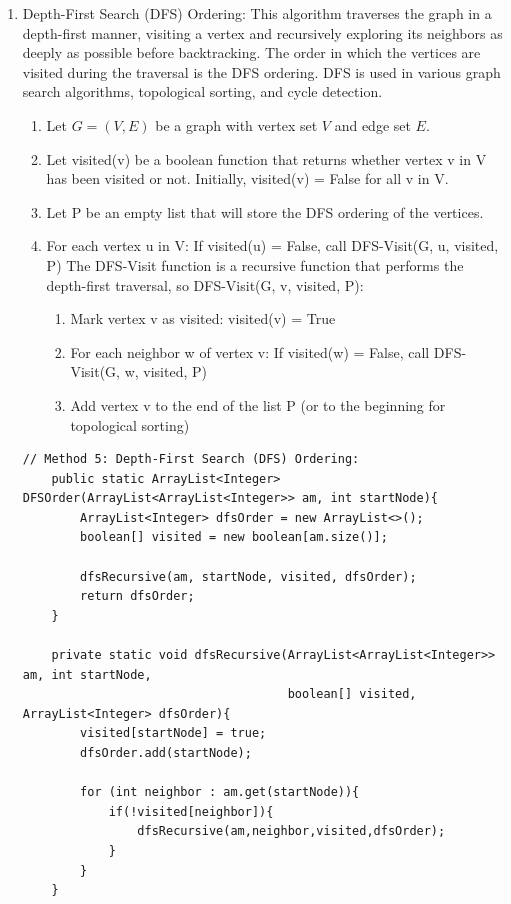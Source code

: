 \documentclass{article}
\begin{document}
\begin{enumerate}
\item Depth-First Search (DFS) Ordering: This algorithm traverses the graph in a depth-first manner, visiting a vertex and recursively exploring its neighbors as deeply as possible before backtracking. The order in which the vertices are visited during the traversal is the DFS ordering. DFS is used in various graph search algorithms, topological sorting, and cycle detection.\cite{DFS}
\begin{enumerate}
\item Let $G = (V, E)$ be a graph with vertex set $V$ and edge set $E$.
\item Let visited(v) be a boolean function that returns whether vertex v in V has been visited or not. Initially, visited(v) = False for all v in V.
\item Let P be an empty list that will store the DFS ordering of the vertices.
\item For each vertex u in V: If visited(u) = False, call DFS-Visit(G, u, visited, P)
The DFS-Visit function is a recursive function that performs the depth-first traversal, so DFS-Visit(G, v, visited, P):
\begin{enumerate}
    \item Mark vertex v as visited: visited(v) = True
    \item For each neighbor w of vertex v: If visited(w) = False, call DFS-Visit(G, w, visited, P)
    \item Add vertex v to the end of the list P (or to the beginning for topological sorting)
\end{enumerate}
\end{enumerate}


    \begin{verbatim}
// Method 5: Depth-First Search (DFS) Ordering:
    public static ArrayList<Integer> DFSOrder(ArrayList<ArrayList<Integer>> am, int startNode){
        ArrayList<Integer> dfsOrder = new ArrayList<>();
        boolean[] visited = new boolean[am.size()];

        dfsRecursive(am, startNode, visited, dfsOrder);
        return dfsOrder;
    }

    private static void dfsRecursive(ArrayList<ArrayList<Integer>> am, int startNode,
                                     boolean[] visited, ArrayList<Integer> dfsOrder){
        visited[startNode] = true;
        dfsOrder.add(startNode);

        for (int neighbor : am.get(startNode)){
            if(!visited[neighbor]){
                dfsRecursive(am,neighbor,visited,dfsOrder);
            }
        }
    }


\end{verbatim}
\end{enumerate}
\end{document}
